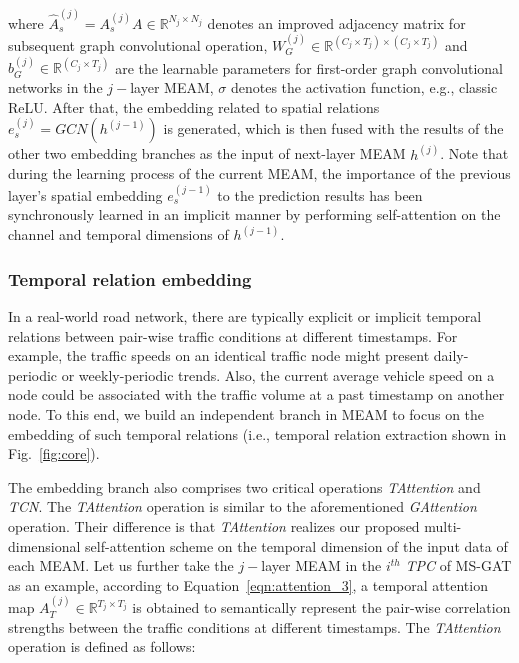 where $\hat{A}_s^{(j)}=A_s^{(j)} A \in \mathbb{R}^{N_j \times N_j}$ denotes an improved adjacency matrix for subsequent graph convolutional operation, $W_G^{(j)} \in \mathbb{R}^{(C_j \times T_j) \times (C_j \times T_j)}$ and $b_G^{(j)}  \in \mathbb{R}^{(C_j \times T_j)}$ are the learnable parameters for first-order graph convolutional networks \cite{kipf2016semi} in the $j-$layer MEAM, $\sigma$ denotes the activation function, e.g., classic ReLU. After that, the embedding related to spatial relations $e_s^{(j)}=GCN(h^{(j-1)})$ is generated, which is then fused with the results of the other two embedding branches as the input of next-layer MEAM $h^{(j)}$. Note that during the learning process of the current MEAM, the importance of the previous layer's spatial embedding $e_s^{(j-1)}$ to the prediction results has been synchronously learned in an implicit manner by performing self-attention on the channel and temporal dimensions of $h^{(j-1)}$.

\subsubsection{Temporal relation embedding}
In a real-world road network, there are typically explicit or implicit temporal relations between pair-wise traffic conditions at different timestamps. For example, the traffic speeds on an identical traffic node might present daily-periodic or weekly-periodic trends. Also, the current average vehicle speed on a node could be associated with the traffic volume at a past timestamp on another node. To this end, we build an independent branch in MEAM to focus on the embedding of such temporal relations (i.e., temporal relation extraction shown in Fig.~\ref{fig:core}).

The embedding branch also comprises two critical operations \textit{TAttention} and \textit{TCN}. The \textit{TAttention} operation is similar to the aforementioned \textit{GAttention} operation. Their difference is that  \textit{TAttention}  realizes our proposed multi-dimensional self-attention scheme on the temporal dimension of the input data of each MEAM. Let us further take the $j-$layer MEAM in the $i^{th}$ \textit{TPC} of MS-GAT as an example, according to Equation~\ref{eqn:attention_3}, a temporal attention map $A_T^{(j)} \in \mathbb{R}^{T_j \times T_j}$ is obtained to semantically represent the pair-wise correlation strengths between the traffic conditions at different timestamps. The \textit{TAttention} operation is defined as follows:

